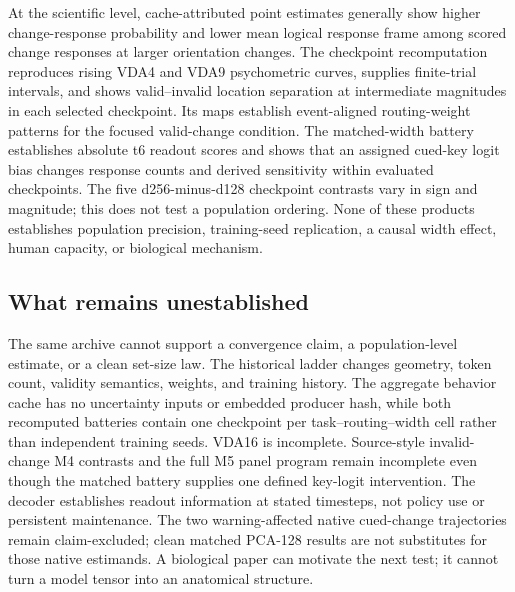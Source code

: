 \documentclass[11pt,a4paper]{article}
\begin{document}
At the scientific level, cache-attributed point estimates generally show higher change-response probability and lower mean logical response frame among scored change responses at larger orientation changes. The checkpoint recomputation reproduces rising VDA4 and VDA9 psychometric curves, supplies finite-trial intervals, and shows valid--invalid location separation at intermediate magnitudes in each selected checkpoint. Its maps establish event-aligned routing-weight patterns for the focused valid-change condition. The matched-width battery establishes absolute t6 readout scores and shows that an assigned cued-key logit bias changes response counts and derived sensitivity within evaluated checkpoints. The five d256-minus-d128 checkpoint contrasts vary in sign and magnitude; this does not test a population ordering. None of these products establishes population precision, training-seed replication, a causal width effect, human capacity, or biological mechanism.

\subsection{What remains unestablished}
The same archive cannot support a convergence claim, a population-level estimate, or a clean set-size law. The historical ladder changes geometry, token count, validity semantics, weights, and training history. The aggregate behavior cache has no uncertainty inputs or embedded producer hash, while both recomputed batteries contain one checkpoint per task--routing--width cell rather than independent training seeds. VDA16 is incomplete. Source-style invalid-change M4 contrasts and the full M5 panel program remain incomplete even though the matched battery supplies one defined key-logit intervention. The decoder establishes readout information at stated timesteps, not policy use or persistent maintenance. The two warning-affected native cued-change trajectories remain claim-excluded; clean matched PCA-128 results are not substitutes for those native estimands. A biological paper can motivate the next test; it cannot turn a model tensor into an anatomical structure.
\end{document}
